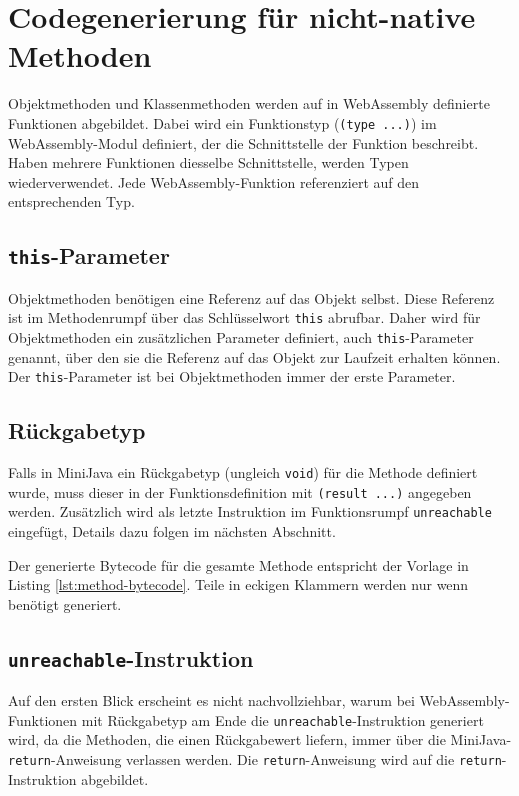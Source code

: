 \section{Codegenerierung für nicht-native Methoden}

Objektmethoden und Klassenmethoden werden auf in WebAssembly definierte Funktionen abgebildet. Dabei wird ein Funktionstyp (\lstinline{(type ...)}) im WebAssembly-Modul definiert, der die Schnittstelle der Funktion beschreibt. Haben mehrere Funktionen diesselbe Schnittstelle, werden Typen wiederverwendet. Jede WebAssembly-Funktion referenziert auf den entsprechenden Typ.

\subsection{\lstinline{this}-Parameter}
Objektmethoden benötigen eine Referenz auf das Objekt selbst. Diese Referenz ist im Methodenrumpf über das Schlüsselwort \lstinline{this} abrufbar. Daher wird für Objektmethoden ein zusätzlichen Parameter definiert, auch \lstinline{this}-Parameter genannt, über den sie die Referenz auf das Objekt zur Laufzeit erhalten können. Der \lstinline{this}-Parameter ist bei Objektmethoden immer der erste Parameter.

\subsection{Rückgabetyp}
Falls in MiniJava ein Rückgabetyp (ungleich \lstinline{void}) für die Methode definiert wurde, muss dieser in der Funktionsdefinition mit \lstinline{(result ...)} angegeben werden. Zusätzlich wird als letzte Instruktion im Funktionsrumpf \lstinline{unreachable} eingefügt, Details dazu folgen im nächsten Abschnitt.

Der generierte Bytecode für die gesamte Methode entspricht der Vorlage in Listing \ref{lst:method-bytecode}. Teile in eckigen Klammern werden nur wenn benötigt generiert.



\subsection{\lstinline{unreachable}-Instruktion}
Auf den ersten Blick erscheint es nicht nachvollziehbar, warum bei Web\-As\-sem\-bly-Funk\-tio\-nen mit Rückgabetyp am Ende die \lstinline{unreachable}-Instruktion generiert wird, da die Methoden, die einen Rückgabewert liefern, immer über die MiniJava-\lstinline{return}-Anweisung verlassen werden. Die \lstinline{return}-Anweisung wird auf die \lstinline{return}-Instruktion abgebildet.


